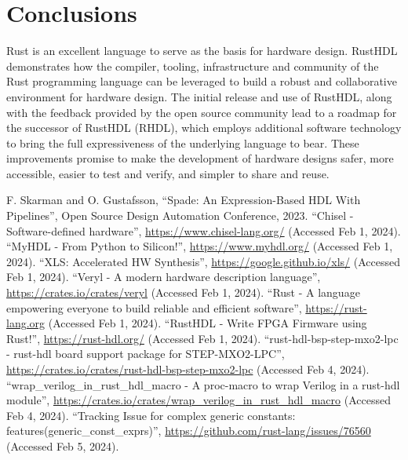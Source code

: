\documentclass[conference]{IEEEtran}
\begin{document}
\section{Conclusions}\label{sec:conclusions}

Rust is an excellent language to serve as the basis for 
hardware design.  RustHDL demonstrates how the compiler, tooling, infrastructure and 
community of the Rust programming language can be leveraged to build a robust and 
collaborative environment for hardware design.  The initial release and use of RustHDL,
along with the feedback provided by the open source community lead to a roadmap for 
the successor of RustHDL (RHDL), which employs additional software technology to bring
the full expressiveness of the underlying language to bear.  These improvements
promise to make the development of hardware designs safer, more accessible, easier to test and 
verify, and simpler to share and reuse.

\begin{thebibliography}{00}
 F. Skarman and O. Gustafsson, ``Spade: An Expression-Based HDL With Pipelines'', Open Source Design Automation Conference, 2023.
 ``Chisel - Software-defined hardware'', \url{https://www.chisel-lang.org/} (Accessed Feb 1, 2024).
 ``MyHDL - From Python to Silicon!'', \url{https://www.myhdl.org/} (Accessed Feb 1, 2024).
 ``XLS: Accelerated HW Synthesis'', \url{https://google.github.io/xls/} (Accessed Feb 1, 2024).
 ``Veryl - A modern hardware description language'', \url{https://crates.io/crates/veryl} (Accessed Feb 1, 2024).
 ``Rust - A language empowering everyone to build reliable and efficient software'', \url{https://rust-lang.org} (Accessed Feb 1, 2024).
 ``RustHDL - Write FPGA Firmware using Rust!'', \url{https://rust-hdl.org/} (Accessed Feb 1, 2024).
 ``rust-hdl-bsp-step-mxo2-lpc - rust-hdl board support package for STEP-MXO2-LPC'', \url{https://crates.io/crates/rust-hdl-bsp-step-mxo2-lpc} (Accessed Feb 4, 2024).
 ``wrap\_verilog\_in\_rust\_hdl\_macro - A proc-macro to wrap Verilog in a rust-hdl module'', \url{https://crates.io/crates/wrap_verilog_in_rust_hdl_macro} (Accessed Feb 4, 2024).
 ``Tracking Issue for complex generic constants: features(generic\_const\_exprs)'', \url{https://github.com/rust-lang/issues/76560} (Accessed Feb 5, 2024).
\end{thebibliography}
\end{document}
